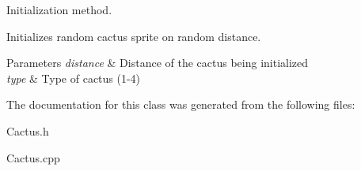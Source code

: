 Initialization method. 

Initializes random cactus sprite on random distance.


\begin{DoxyParams}{Parameters}
{\em distance} & Distance of the cactus being initialized \\
\hline
{\em type} & Type of cactus (1-\/4) \\
\hline
\end{DoxyParams}


The documentation for this class was generated from the following files\+:\begin{DoxyCompactItemize}
\item 
Cactus.\+h\item 
Cactus.\+cpp\end{DoxyCompactItemize}
